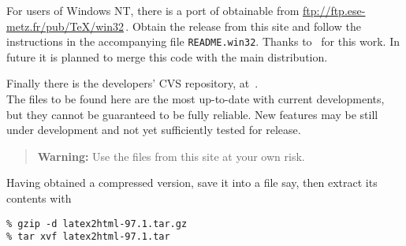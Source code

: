 \bigskip
{}%
\noindent
{}\begin{changebar}%
For users of Windows NT, there is a port of \latextohtml{} obtainable
from \url{ftp://ftp.ese-metz.fr/pub/TeX/win32}\,. Obtain the release from
this site and follow the instructions in the accompanying file
\texttt{README.win32}. \html{\\}Thanks to \Popineau\ for this work.\html{\\} 
In future it is planned to merge this code with the main distribution.
\end{changebar}

\bigskip
{}\label{cvsrepos}%
\noindent
{}\begin{changebar}%
Finally there is the \latextohtml{} developers' CVS repository, at \CVSrepos\,.\\
The files to be found here are the most up-to-date with current developments,
but they cannot be guaranteed to be fully reliable. New features may be
still under development and not yet sufficiently tested for release.

\begin{quote}
\textbf{Warning: }Use the files from this site at your own risk.
\end{quote}%
\end{changebar}

\htmlrule{}%
\medskip\noindent
Having obtained a compressed  version, save it into a file 
 say,
then extract its contents with 
\begin{small}
\begin{verbatim}
% gzip -d latex2html-97.1.tar.gz
% tar xvf latex2html-97.1.tar
\end{verbatim} 
\end{small}
%

